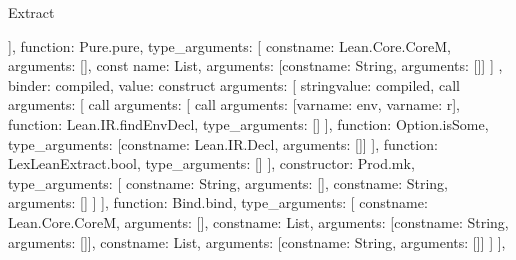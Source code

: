 \begin{lexlean}{Extract}
\begin{toolingmodule}
{{{{{{{{{{{{                                  ],
                                  function: Pure.pure,
                                  type_arguments: [
                                    const{name: Lean.Core.CoreM, arguments: []},
                                    const{
                                      name: List,
                                      arguments: [const{name: String, arguments: []}]
                                    }
                                  ]
                                },
                                binder: compiled,
                                value: construct{
                                  arguments: [
                                    string{value: compiled},
                                    call{
                                      arguments: [
                                        call{
                                          arguments: [
                                            call{
                                              arguments: [var{name: env}, var{name: r}],
                                              function: Lean.IR.findEnvDecl,
                                              type_arguments: []
                                            }
                                          ],
                                          function: Option.isSome,
                                          type_arguments: [const{name: Lean.IR.Decl, arguments: []}]
                                        }
                                      ],
                                      function: LexLeanExtract.bool,
                                      type_arguments: []
                                    }
                                  ],
                                  constructor: Prod.mk,
                                  type_arguments: [
                                    const{name: String, arguments: []},
                                    const{name: String, arguments: []}
                                  ]
                                }
                              }
                            }
                          ],
                          function: Bind.bind,
                          type_arguments: [
                            const{name: Lean.Core.CoreM, arguments: []},
                            const{name: List, arguments: [const{name: String, arguments: []}]},
                            const{name: List, arguments: [const{name: String, arguments: []}]}
                          ]
                        }
                      }
                    ],
}}}}}}}
\end{toolingmodule}
\end{lexlean}
